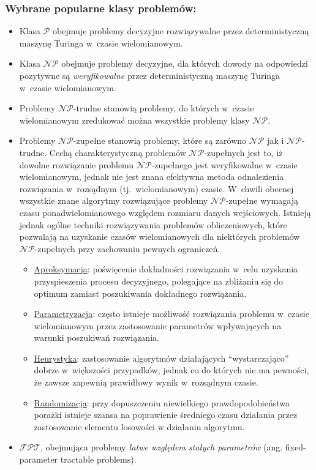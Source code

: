 \subsubsection{Wybrane popularne klasy problemów:}
\label{sss_popular_cplx_classes}
\par{
\begin{itemize}
  \item Klasa $\mathcal{P}$ obejmuje problemy decyzyjne rozwiązywalne przez
    deterministyczną maszynę Turinga w~czasie wielomianowym.
  \item Klasa $\mathcal{NP}$ obejmuje problemy decyzyjne, dla których dowody na 
    odpowiedzi pozytywne są \emph{weryfikowalne} przez deterministyczną maszynę
    Turinga w~czasie wielomianowym.
  \item Problemy $\mathcal{NP}$-trudne stanowią problemy, do których w~czasie
    wielomianowym zredukować można wszystkie problemy klasy $\mathcal{NP}$.
  \item Problemy $\mathcal{NP}$-zupełne stanowią problemy, które są zarówno
    $\mathcal{NP}$ jak i $\mathcal{NP}$-trudne.
    Cechą charakterystyczną problemów $\mathcal{NP}$-zupełnych jest to, iż
    dowolne rozwiązanie problemu $\mathcal{NP}$-zupełnego jest weryfikowalne
    w~czasie wielomianowym, jednak nie jest znana efektywna metoda odnalezienia
    rozwiązania w~rozsądnym (tj.\ wielomianowym) czasie. 
    W~chwili obecnej wszystkie znane algorytmy rozwiązujące problemy 
    $\mathcal{NP}$-zupełne wymagają czasu ponadwielomianowego względem rozmiaru
    danych wejściowych.
    Istnieją jednak ogólne techniki rozwiązywania problemów obliczeniowych,
    które pozwalają na uzyskanie czasów wielomianowych dla niektórych problemów
    $\mathcal{NP}$-zupełnych przy zachowaniu pewnych ograniczeń.
    \begin{itemize}
      \item \underline{Aproksymacja}: poświęcenie dokładności rozwiązania
        w~celu uzyskania przyspieszenia procesu decyzyjnego, polegające na zbliżaniu się do
        optimum zamiast poszukiwania dokładnego rozwiązania.
      \item \underline{Parametryzacja}: często istnieje możliwość rozwiązania
        problemu w~czasie wielomianowym przez zastosowanie parametrów wpływających na warunki
        poszukiwań rozwiązania.
      \item \underline{Heurystyka}: zastosowanie algorytmów działających
        ``wystarczająco'' dobrze w~większości przypadków, jednak co do których
        nie ma pewności, że zawsze zapewnią prawidłowy wynik w~rozsądnym czasie.
      \item \underline{Randomizacja}: przy dopuszczeniu niewielkiego
        prawdopodobieństwa porażki istnieje szansa na poprawienie
        średniego czasu działania przez zastosowanie elementu losowości w
        działaniu algorytmu.
    \end{itemize}
  \item $\mathcal{FPT}$, obejmująca problemy \emph{łatwe względem stałych parametrów} (ang. fixed-parameter tractable problems).
\end{itemize}

}
